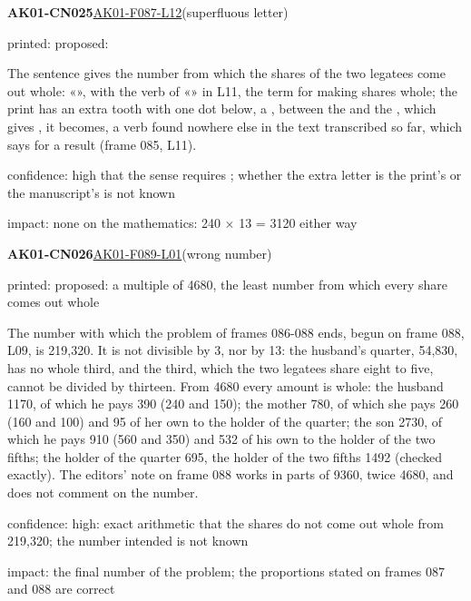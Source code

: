 \documentclass[11pt]{article}
\begin{document}
\noindent\textbf{AK01-CN025}\enspace\hyperlink{AK01-F087-L12}{AK01-F087-L12}\enspace(superfluous letter)\par\noindent printed: \enspace proposed: \par\noindent The sentence gives the number from which the shares of the two legatees come out whole: «», with the verb of «» in L11, the term for making shares whole; the print has an extra tooth with one dot below, a , between the  and the , which gives , it becomes, a verb found nowhere else in the text transcribed so far, which says  for a result (frame 085, L11).\par\noindent confidence: high that the sense requires ; whether the extra letter is the print's or the manuscript's is not known\par\noindent impact: none on the mathematics: 240 × 13 = 3120 either way\par\medskip
\noindent\textbf{AK01-CN026}\enspace\hyperlink{AK01-F089-L01}{AK01-F089-L01}\enspace(wrong number)\par\noindent printed: \enspace proposed: a multiple of 4680, the least number from which every share comes out whole\par\noindent The number with which the problem of frames 086-088 ends, begun on frame 088, L09, is 219,320. It is not divisible by 3, nor by 13: the husband's quarter, 54,830, has no whole third, and the third, which the two legatees share eight to five, cannot be divided by thirteen. From 4680 every amount is whole: the husband 1170, of which he pays 390 (240 and 150); the mother 780, of which she pays 260 (160 and 100) and 95 of her own to the holder of the quarter; the son 2730, of which he pays 910 (560 and 350) and 532 of his own to the holder of the two fifths; the holder of the quarter 695, the holder of the two fifths 1492 (checked exactly). The editors' note on frame 088 works in parts of 9360, twice 4680, and does not comment on the number.\par\noindent confidence: high: exact arithmetic that the shares do not come out whole from 219,320; the number intended is not known\par\noindent impact: the final number of the problem; the proportions stated on frames 087 and 088 are correct\par\medskip
\end{document}
